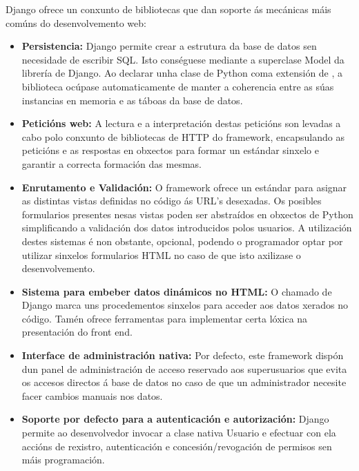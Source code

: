 Django ofrece un conxunto de bibliotecas que dan soporte ás mecánicas máis comúns do desenvolvemento
web:

\begin{itemize}
	
	\item \textbf{Persistencia:} Django permite crear a estrutura da base de datos sen necesidade de escribir SQL. Isto 
	conséguese mediante a superclase Model da librería  de Django. Ao declarar unha clase de Python coma
	extensión de , a biblioteca ocúpase automaticamente de manter a coherencia entre as súas instancias en 
	memoria e as táboas da base de datos. 
	
	\item \textbf{Peticións web:} A lectura e a interpretación destas peticións son levadas a cabo polo conxunto de bibliotecas
	de HTTP do framework, encapsulando as peticións e as respostas en obxectos para formar un estándar sinxelo e garantir
	a correcta formación das mesmas.
	
	\item \textbf{Enrutamento e Validación:} O framework ofrece un estándar para asignar as distintas vistas definidas no código
	ás URL's desexadas. Os posibles formularios presentes nesas vistas poden ser abstraídos en obxectos de Python 
	simplificando a validación dos datos introducidos polos usuarios. A utilización destes sistemas é non obstante, 
	opcional, podendo o programador optar por utilizar sinxelos formularios HTML no caso de que isto axilizase 
	o desenvolvemento.
	
	\item \textbf{Sistema para embeber datos dinámicos no HTML:} O chamado  de Django marca uns procedementos
	sinxelos para acceder aos datos xerados no código. Tamén ofrece ferramentas para implementar certa lóxica
	na presentación do front end.
	
	\item \textbf{Interface de administración nativa:} Por defecto, este framework dispón dun panel de administración de acceso
	reservado aos superusuarios que evita os accesos directos á base de datos no caso de que un administrador necesite
	facer cambios manuais nos datos.
	
	\item \textbf{Soporte por defecto para a autenticación e autorización:} Django permite ao desenvolvedor invocar a clase 
	nativa Usuario e efectuar con ela accións de rexistro, autenticación e concesión/revogación de permisos sen máis
	programación.

\end{itemize}   


